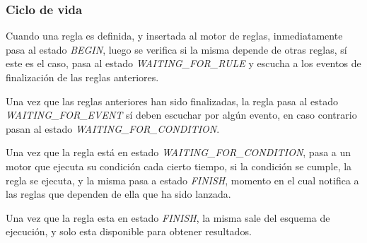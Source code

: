 \subsubsection{Ciclo de vida}

Cuando una regla es definida, y insertada al motor de reglas, inmediatamente
pasa al estado \emph{BEGIN}, luego se verifica si la misma depende de otras
reglas, sí este es el caso, pasa al estado \emph{WAITING\_FOR\_RULE} y escucha a
los eventos de finalización de las reglas anteriores.

Una vez que las reglas anteriores han sido finalizadas, la regla pasa al estado
\emph{WAITING\_FOR\_EVENT} sí deben escuchar por algún evento, en caso contrario
pasan al estado \emph{WAITING\_FOR\_CONDITION}.

Una vez que la regla está en estado \emph{WAITING\_FOR\_CONDITION}, pasa a un
motor que ejecuta su condición cada cierto tiempo, si la condición se cumple, la
regla se ejecuta, y la misma pasa a estado \emph{FINISH}, momento en el cual
notifica a las reglas que dependen de ella que ha sido lanzada.

Una vez que la regla esta en estado \emph{FINISH}, la misma sale del esquema de
ejecución, y solo esta disponible para obtener resultados.



